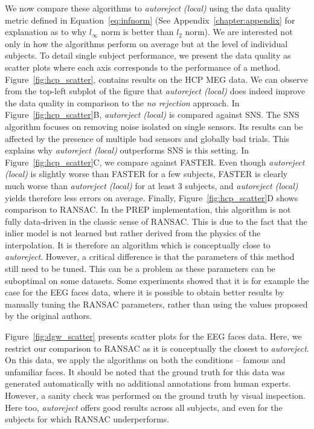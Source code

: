 We now compare these algorithms to \emph{autoreject (local)} using the data quality metric defined in Equation~\eqref{eq:infnorm} (See Appendix~\ref{chapter:appendix} for explanation as to why $l_\infty$ norm is better than $l_2$ norm). 
We are interested not only in how the algorithms perform on average but at the level of individual subjects. To detail single subject performance, we present the data quality as scatter plots where each axis corresponds to the performance of a method. Figure~\ref{fig:hcp_scatter}, contains results on the HCP MEG data. We can observe from the top-left subplot of the figure that \emph{autoreject (local)} does indeed improve the data quality in comparison to the \emph{no rejection} approach. In Figure~\ref{fig:hcp_scatter}B, \emph{autoreject (local)} is compared against SNS. The SNS algorithm focuses on removing noise isolated on single sensors. Its results can be affected by the presence of multiple bad sensors and globally bad trials. This explains why \emph{autoreject (local)} outperforms SNS is this setting. In Figure~\ref{fig:hcp_scatter}C, we compare against FASTER. Even though \emph{autoreject (local)} is slightly worse than FASTER for a few subjects, FASTER is clearly much worse than \emph{autoreject (local)} for at least 3 subjects, and \emph{autoreject (local)} yields therefore less errors on average. Finally, Figure~\ref{fig:hcp_scatter}D shows comparison to RANSAC. In the PREP implementation, this algorithm is not fully data-driven in the classic sense of RANSAC. This is due to the fact that the inlier model is not learned but rather derived from the physics of the interpolation. It is therefore an algorithm which is conceptually close to \emph{autoreject}. However, a critical difference is that the parameters of this method still need to be tuned. This can be a problem as these parameters can be suboptimal on some datasets. Some experiments showed that it is for example the case for the EEG faces data, where it is possible to obtain better results by manually tuning the RANSAC parameters, rather than using the values proposed by the original authors.

Figure~\ref{fig:dgw_scatter} presents scatter plots for the EEG faces data.
%
Here, we restrict our comparison to RANSAC as it is conceptually the closest to \emph{autoreject}. On this data, we apply the algorithms on both the conditions -- famous and unfamiliar faces. It should be noted that the ground truth for this data was generated automatically with no additional annotations from human experts. However, a sanity check was performed on the ground truth by visual inspection. Here too, \emph{autoreject} offers good results across all subjects, and even for the subjects for which RANSAC underperforms.

